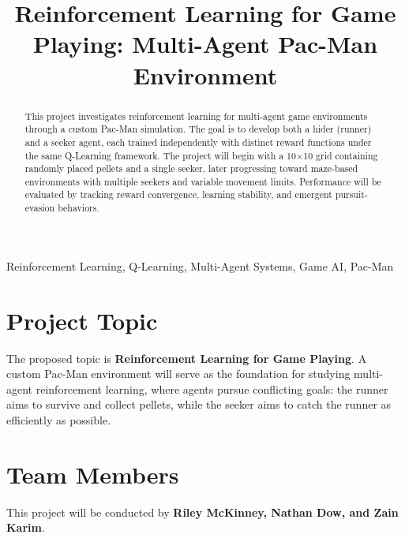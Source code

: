 \documentclass[conference]{IEEEtran}
\begin{document}
\title{Reinforcement Learning for Game Playing: Multi-Agent Pac-Man Environment}

\author{
}

\maketitle

\begin{abstract}
This project investigates reinforcement learning for multi-agent game environments through a custom Pac-Man simulation. The goal is to develop both a hider (runner) and a seeker agent, each trained independently with distinct reward functions under the same Q-Learning framework. The project will begin with a 10$\times$10 grid containing randomly placed pellets and a single seeker, later progressing toward maze-based environments with multiple seekers and variable movement limits. Performance will be evaluated by tracking reward convergence, learning stability, and emergent pursuit-evasion behaviors.
\end{abstract}

\begin{IEEEkeywords}
Reinforcement Learning, Q-Learning, Multi-Agent Systems, Game AI, Pac-Man
\end{IEEEkeywords}

\section{Project Topic}
The proposed topic is \textbf{Reinforcement Learning for Game Playing}.  
A custom Pac-Man environment will serve as the foundation for studying multi-agent reinforcement learning, where agents pursue conflicting goals: the runner aims to survive and collect pellets, while the seeker aims to catch the runner as efficiently as possible.

\section{Team Members}
This project will be conducted by \textbf{Riley McKinney, Nathan Dow, and Zain Karim}.
\end{document}
